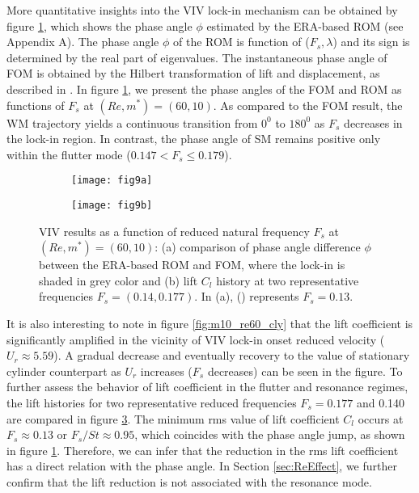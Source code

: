 \documentclass{jfm}
\newcommand{\bluedashdot}{\raisebox{2pt}{\tikz{\draw[blue,dashdotted,line width=1.2pt](0,0) -- (5mm,0);}}}
\begin{document}
More quantitative insights into the VIV lock-in mechanism can be obtained by 
figure \ref{fig:m10_re60_Phi}, which shows the phase angle $\phi$ estimated 
by the ERA-based ROM (see Appendix A). The phase angle $\phi$ of the ROM is function of ($F_s,\lambda$) and its
sign is determined by the real part of eigenvalues. 
The instantaneous phase angle of FOM is obtained 
by the Hilbert transformation of lift and displacement, as described in \cite{Tham2015}. 
%
In figure \ref{fig:m10_re60_Phi}, we present the phase angles of the FOM and 
ROM as functions of $F_s$ at $(Re,m^*)=(60,10)$.
%
As compared to the FOM result, 
the WM trajectory yields a continuous transition from $0^0$ to $180^0$ as $F_s$ decreases in the lock-in region.
In contrast, the phase angle of SM remains positive only within 
the flutter mode ($0.147 < F_{s} \le 0.179$). 
%

\begin{figure}
\centering
\centering
\begin{subfigure}{0.495\textwidth}
\centering
	 \texttt{[image: fig9a]}
    \caption{}
    \label{fig:m10_re60_Phi}
    \end{subfigure} 
\begin{subfigure}{0.495\textwidth} 
\centering
     \texttt{[image: fig9b]}
	\caption{}
	\label{fig:m10_response}
	\end{subfigure}	
	\caption{VIV results as a function of reduced natural frequency $F_s$ 
        at $(Re,m^*)=(60,10)$: (a) comparison of 
        phase angle difference $\phi$ between the ERA-based ROM and FOM, where 
        the lock-in is shaded in grey color and 
	 (b) lift $C_l$ history at two representative 
         frequencies $F_s=(0.14,0.177)$.
         In (a), ({\protect\bluedashdot}) represents $F_s=0.13$. }
\end{figure}

It is also interesting to note in figure \ref{fig:m10_re60_cly} that the lift coefficient 
is significantly amplified in the vicinity of VIV lock-in onset reduced velocity ($U_r \approx 5.59$).
A gradual decrease and eventually recovery to the value of stationary cylinder counterpart 
as $U_r$ increases ($F_s$ decreases) can be seen in the figure. 
To further assess the behavior of lift coefficient in the 
flutter and resonance regimes, the lift histories for two 
representative reduced frequencies $F_{s}=0.177$ and 0.140
are compared in figure \ref{fig:m10_response}. 
The minimum rms value of lift coefficient $C_l$ occurs 
at $F_s \approx 0.13$ or $F_s / St \approx 0.95$, which coincides with the phase angle jump, as shown in figure \ref{fig:m10_re60_Phi}. 
Therefore, we can infer that 
the reduction in the rms lift coefficient has a direct relation 
with the phase angle. In Section \ref{sec:ReEffect}, 
we further confirm that the lift reduction is not associated with the resonance mode.
\end{document}
